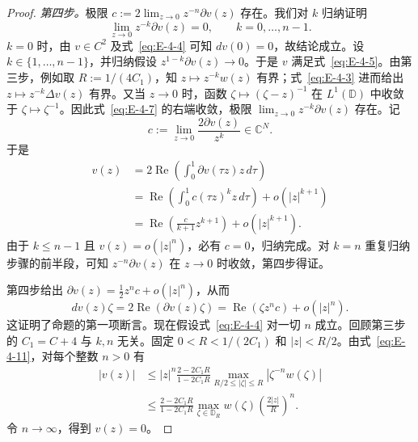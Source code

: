 \begin{proof}
\emph{第四步。}极限 $c:=2\lim_{z\to0}z^{-n}\partial v(z)$ 存在。我们对 $k$ 归纳证明
\[
  \lim_{z\to0}z^{-k}\partial v(z)=0,
  \qquad k=0,\ldots,n-1.
\]
$k=0$ 时，由 $v\in C^2$ 及式~\eqref{eq:E-4-4} 可知 $dv(0)=0$，故结论成立。设 $k\in\{1,\ldots,n-1\}$，并归纳假设 $z^{1-k}\partial v(z)\to0$。于是 $v$ 满足式~\eqref{eq:E-4-5}。由第三步，例如取 $R:=1/(4C_1)$，知 $z\mapsto z^{-k}w(z)$ 有界；式~\eqref{eq:E-4-3} 进而给出 $z\mapsto z^{-k}\Delta v(z)$ 有界。又当 $z\to0$ 时，函数 $\zeta\mapsto(\zeta-z)^{-1}$ 在 $L^1(\mathbb D)$ 中收敛于 $\zeta\mapsto\zeta^{-1}$。因此式~\eqref{eq:E-4-7} 的右端收敛，极限 $\lim_{z\to0}z^{-k}\partial v(z)$ 存在。记
\[
  c:=\lim_{z\to0}\frac{2\partial v(z)}{z^k}\in\mathbb C^N.
\]
于是
\begin{align*}
v(z)
 &=2\operatorname{Re}\left(\int_0^1\partial v(\tau z)z\,d\tau\right)\\
 &=\operatorname{Re}\left(\int_0^1c(\tau z)^kz\,d\tau\right)
   +o(|z|^{k+1})\\
 &=\operatorname{Re}\left(\frac{c}{k+1}z^{k+1}\right)
   +o(|z|^{k+1}).
\end{align*}
由于 $k\le n-1$ 且 $v(z)=o(|z|^n)$，必有 $c=0$，归纳完成。对 $k=n$ 重复归纳步骤的前半段，可知 $z^{-n}\partial v(z)$ 在 $z\to0$ 时收敛，第四步得证。

第四步给出 $\partial v(z)=\tfrac12z^nc+o(|z|^n)$，从而
\[
  dv(z)\zeta=2\operatorname{Re}(\partial v(z)\zeta)
  =\operatorname{Re}(\zeta z^nc)+o(|z|^n).
\]
这证明了命题的第一项断言。现在假设式~\eqref{eq:E-4-4} 对一切 $n$ 成立。回顾第三步的 $C_1=C+4$ 与 $k,n$ 无关。固定 $0<R<1/(2C_1)$ 和 $|z|<R/2$。由式~\eqref{eq:E-4-11}，对每个整数 $n>0$ 有
\begin{align*}
|v(z)|
&\le |z|^n\frac{2-2C_1R}{1-2C_1R}
   \max_{R/2\le|\zeta|\le R}|\zeta^{-n}w(\zeta)|\\
&\le\frac{2-2C_1R}{1-2C_1R}
   \max_{\zeta\in\mathbb D_R}w(\zeta)
   \left(\frac{2|z|}{R}\right)^n.
\end{align*}
令 $n\to\infty$，得到 $v(z)=0$。
\end{proof}

